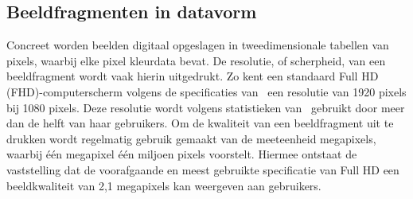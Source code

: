 \subsection{Beeldfragmenten in datavorm}\label{subsec:beeldfragmenten-als-data}
Concreet worden beelden digitaal opgeslagen in tweedimensionale tabellen van pixels, waarbij elke pixel kleurdata bevat.
De resolutie, of scherpheid, van een beeldfragment wordt vaak hierin uitgedrukt.
Zo kent een standaard Full HD (FHD)-computerscherm volgens de specificaties van~\textcite{VESA2013} een resolutie van 1920 pixels bij 1080 pixels.
Deze resolutie wordt volgens statistieken van~\textcite{ValveCorporation2024} gebruikt door meer dan de helft van haar gebruikers.
Om de kwaliteit van een beeldfragment uit te drukken wordt regelmatig gebruik gemaakt van de meeteenheid megapixels, waarbij \'e\'en megapixel \'e\'en miljoen pixels voorstelt.
Hiermee ontstaat de vaststelling dat de voorafgaande en meest gebruikte specificatie van Full HD een beeldkwaliteit van 2,1 megapixels kan weergeven aan gebruikers.

